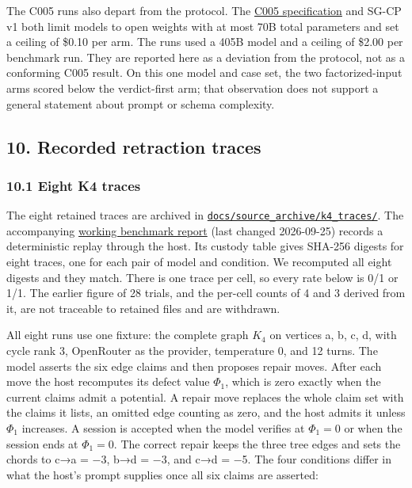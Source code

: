 \documentclass[
  11pt,
]{article}
\begin{document}
The C005 runs also depart from the protocol. The
\href{https://github.com/dbccpage/the_symbol_game/blob/a623568eb0f853b968bc419bf06dfc6af256ab02/projects/mssn_sn_symgam/challenges/a_mechanism/c005_hosted_decode_controls_bakeoff.md}{C005
specification} and SG-CP v1 both limit models to open weights with at
most 70B total parameters and set a ceiling of \$0.10 per arm. The runs
used a 405B model and a ceiling of \$2.00 per benchmark run. They are
reported here as a deviation from the protocol, not as a conforming C005
result. On this one model and case set, the two factorized-input arms
scored below the verdict-first arm; that observation does not support a
general statement about prompt or schema complexity.

\hypertarget{recorded-retraction-traces}{%
\subsection{10. Recorded retraction
traces}\label{recorded-retraction-traces}}

\hypertarget{eight-k4-traces}{%
\subsubsection{10.1 Eight K4 traces}\label{eight-k4-traces}}

The eight retained traces are archived in
\href{../../008_pfp_mssn_tower_challenges_and_retraction_benchmarks/docs/source_archive/README.md}{\nolinkurl{docs/source_archive/k4_traces/}}.
The accompanying
\href{../../008_pfp_mssn_tower_challenges_and_retraction_benchmarks/docs/source_archive/k4_benchmark_report.md}{working
benchmark report} (last changed 2026-09-25) records a deterministic
replay through the host. Its custody table gives SHA-256 digests for
eight traces, one for each pair of model and condition. We recomputed
all eight digests and they match. There is one trace per cell, so every
rate below is 0/1 or 1/1. The earlier figure of 28 trials, and the
per-cell counts of 4 and 3 derived from it, are not traceable to
retained files and are withdrawn.

All eight runs use one fixture: the complete graph \(K_4\) on vertices
a, b, c, d, with cycle rank 3, OpenRouter as the provider, temperature
0, and 12 turns. The model asserts the six edge claims and then proposes
repair moves. After each move the host recomputes its defect value
\(\Phi_1\), which is zero exactly when the current claims admit a
potential. A repair move replaces the whole claim set with the claims it
lists, an omitted edge counting as zero, and the host admits it unless
\(\Phi_1\) increases. A session is accepted when the model verifies at
\(\Phi_1=0\) or when the session ends at \(\Phi_1=0\). The correct
repair keeps the three tree edges and sets the chords to c→a = −3, b→d =
−3, and c→d = −5. The four conditions differ in what the host's prompt
supplies once all six claims are asserted:
\end{document}
